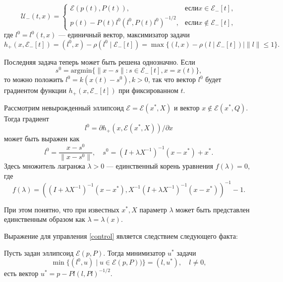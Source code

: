 \begin{equation}\label{control}
    \mathcal{U}_-(t,x) = 
     \begin{cases}
        \mathcal{E}(p(t), P(t)), & \text{если} x \in \mathcal{E}_-[t], \\
        p(t) - P(t)l^0(l^0, P(t)l^0)^{-1/2}, & \text{если} x \notin \mathcal{E}_-[t],
     \end{cases}
\end{equation}
где \( l^0 = l^0(t,x) \) --- единичный вектор, максимизатор задачи
\begin{equation}
    h_+(x, \mathcal{E}_-[t]) = (l^0,x) - \rho(l^0 \mid \mathcal{E}_-[t]) = \max\{(l,x) - \rho(l \mid 
     \mathcal{E}_-[t]) \mid \| l \| \le 1 \}.
\end{equation}

Последняя задача теперь может быть решена однозначно. Если 
\begin{equation}
    s^0 = \text{argmin}\{ \| x - s \| : s \in \mathcal{E}_-[t], x = x(t) \},
\end{equation}
то можно положить \( l^0 = k(x(t) - s^0), k > 0 \), так что вектор \( l^0 \) будет градиентом функции
\( h_+(x, \mathcal{E}_-[t]) \) при фиксированном \( t \). 

\begin{lemma}
    Рассмотрим невырожденный эллипсоид \( \mathcal{E} = \mathcal{E}(x^*, X) \) и вектор \( x \notin 
     \mathcal{E}(x^*, Q). \) Тогда градиент
    \begin{equation*}
        l^0 = \partial h_+(x, \mathcal{E}(x^*, X)) / \partial x
    \end{equation*}
    может быть выражен как 
    \begin{equation}
        l^0 = \frac{x - s^0}{\| x - s^0 \|}, \quad s^0 = (I + \lambda X^{-1})^{-1}(x - x^*) + x^*.
    \end{equation}
    Здесь множитель лагранжа \( \lambda > 0 \) --- единственный корень уравнения \( f(\lambda) = 0 \),
    где
    \begin{equation*}
        f(\lambda) = ((I + \lambda X^{-1})^{-1}(x - x^*), X^{-1}(I + \lambda X^{-1})^{-1}(x - x^*))^{-1} - 1.
    \end{equation*}
\end{lemma}

При этом понятно, что при известных \( x^*, X \) параметр \( \lambda \) может быть представлен 
 единственным образом как \( \lambda = \lambda(x) \).

Выражение для управления \eqref{control} является следствием следующего факта:
\begin{lemma}
    Пусть задан эллипсоид \( \mathcal{E}(p, P) \). Тогда минимизатор \( u^* \) задачи
    \begin{equation*}
        \min\{ (l^0, u) \mid u \in \mathcal{E}(p, P)) \} = (l, u^*), \quad l \ne 0, 
    \end{equation*}
    есть вектор \( u^* = p - Pl(l, Pl)^{-1/2} \).
\end{lemma}






